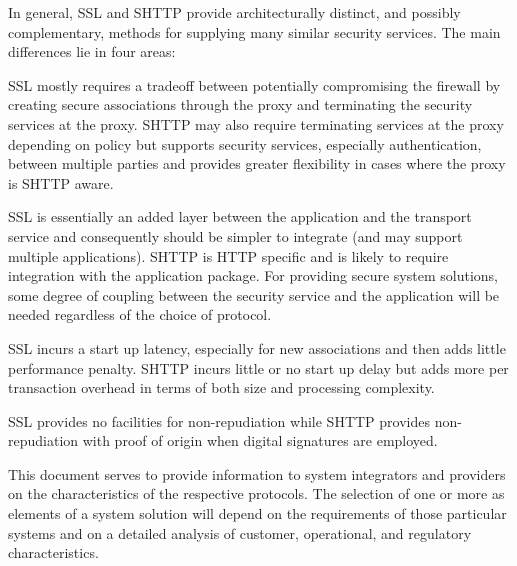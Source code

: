 In general, SSL and SHTTP provide architecturally distinct, and
possibly complementary, methods for supplying many similar security
services. The main differences lie in four areas:
\begin{htmllist}
  \item[Operation in proxy environments]
  
    SSL mostly requires a tradeoff between potentially compromising the
    firewall by creating secure associations through the proxy and
    terminating the security services at the proxy. SHTTP may also require
    terminating services at the proxy depending on policy but supports
    security services, especially authentication, between multiple parties
    and provides greater flexibility in cases where the proxy is SHTTP
    aware.

  \item[Nature of integration]
    
    SSL is essentially an added layer between the application and the
    transport service and consequently should be simpler to integrate (and
    may support multiple applications). SHTTP is HTTP specific and is
    likely to require integration with the application package. For
    providing secure system solutions, some degree of coupling between the
    security service and the application will be needed regardless of the
    choice of protocol.

  \item[Performance]
    
    SSL incurs a start up latency, especially for new associations and then
    adds little performance penalty. SHTTP incurs little or no start up
    delay but adds more per transaction overhead in terms of both size and
    processing complexity.

  \item[Non-repudiation]
    
    SSL provides no facilities for non-repudiation while SHTTP provides
    non-repudiation with proof of origin when digital signatures are
    employed.
\end{htmllist}

This document serves to provide information to system integrators and
providers on the characteristics of the respective protocols. The
selection of one or more as elements of a system solution will depend
on the requirements of those particular systems and on a detailed
analysis of customer, operational, and regulatory characteristics.

